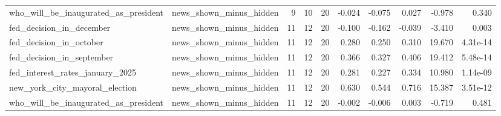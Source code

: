 \begin{longtable}{llrrrrrrrr}
who\_will\_be\_inaugurated\_as\_president & news\_shown\_minus\_hidden & 9 & 10 & 20 & -0.024 & -0.075 & 0.027 & -0.978 & 0.340 \\
fed\_decision\_in\_december & news\_shown\_minus\_hidden & 11 & 12 & 20 & -0.100 & -0.162 & -0.039 & -3.410 & 0.003 \\
fed\_decision\_in\_october & news\_shown\_minus\_hidden & 11 & 12 & 20 & 0.280 & 0.250 & 0.310 & 19.670 & 4.31e-14 \\
fed\_decision\_in\_september & news\_shown\_minus\_hidden & 11 & 12 & 20 & 0.366 & 0.327 & 0.406 & 19.412 & 5.48e-14 \\
fed\_interest\_rates\_january\_2025 & news\_shown\_minus\_hidden & 11 & 12 & 20 & 0.281 & 0.227 & 0.334 & 10.980 & 1.14e-09 \\
new\_york\_city\_mayoral\_election & news\_shown\_minus\_hidden & 11 & 12 & 20 & 0.630 & 0.544 & 0.716 & 15.387 & 3.51e-12 \\
who\_will\_be\_inaugurated\_as\_president & news\_shown\_minus\_hidden & 11 & 12 & 20 & -0.002 & -0.006 & 0.003 & -0.719 & 0.481 \\
\end{longtable}
\normalsize
